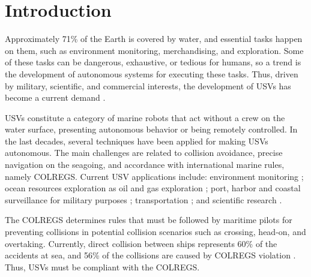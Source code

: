 \chapter{Introduction \label{chap:intro}}

    
    Approximately 71\% of the Earth is covered by water, and essential tasks happen on them, such as environment monitoring, merchandising, and exploration. Some of these tasks can be dangerous, exhaustive, or tedious for humans, so a trend is the development of autonomous systems for executing these tasks. Thus, driven by military, scientific, and commercial interests, the development of \acp{USV} has become a current demand \cite{Liu2016Unmanned}.
    
    \acp{USV} constitute a category of marine robots that act without a crew on the water surface, presenting autonomous behavior or being remotely controlled. In the last decades, several techniques have been applied for making \acp{USV} autonomous. The main challenges are related to collision avoidance, precise navigation on the seagoing, and accordance with international marine rules, namely \ac{COLREGS}.
    Current \ac{USV} applications include: environment monitoring \cite{Caccia2005Sampling}; ocean resources exploration as oil and gas exploration \cite{Pastore2010Improving}; port, harbor and coastal surveillance for military purposes \cite{Caccia2007unmanned, Pastore2010Improving, Svec2011aAutomated}; transportation \cite{Kiencke2005Impact}; and scientific research \cite{Yan2010Development}.
    
    The \acs{COLREGS} determines rules that must be followed by maritime pilots for preventing collisions in potential collision scenarios such as crossing, head-on, and overtaking. Currently, direct collision between ships represents 60\% of the accidents at sea, and 56\% of the collisions are caused by \acs{COLREGS} violation \cite{Liu2016Unmanned, Campbell2012Review_COLREGs}. Thus, \acp{USV} must be compliant with the \ac{COLREGS}.
    
